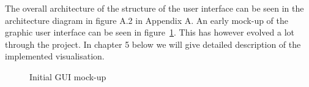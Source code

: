 The overall architecture of the structure of the user interface can be seen in the architecture diagram in figure A.2 in Appendix A. An early mock-up of the graphic user interface can be seen in figure~\ref{fig:guiProposal}. This has however evolved a lot through the project. In chapter 5 below we will give detailed description of the implemented visualisation.

\begin{figure}[ht]
	\caption{Initial GUI mock-up}
	\label{fig:guiProposal}
\end{figure}


